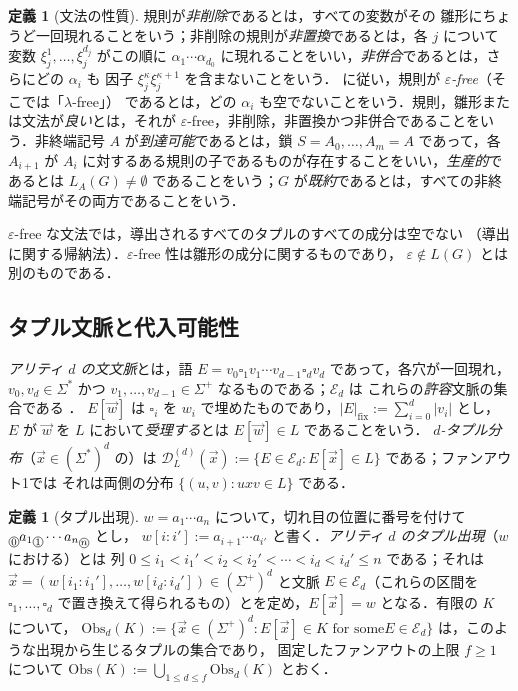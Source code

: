 \documentclass[11pt,a4paper]{ltjsarticle}
\numberwithin{equation}{section}
\theoremstyle{plain}
\theoremstyle{definition}
\newtheorem{definition}[theorem]{定義}
\theoremstyle{remark}
\newcommand{\D}{\mathcal{D}}
\newcommand{\tuple}[1]{\vec{#1}}
\newcommand{\blank}{\square}
\newcommand{\eps}{\varepsilon}
\newcommand{\cutpos}[1]{%
  \raisebox{-0.7ex}{%
    \tikz[baseline=(char.base)]{%
      \node[draw,circle,inner sep=0.4pt,font=\scriptsize]
        (char) {\ensuremath{#1}};%
    }%
  }%
}
\theoremstyle{plain}
\begin{document}
\begin{definition}[文法の性質]
\label{def:grammar-properties}
規則が\emph{非削除}であるとは，すべての変数がその
雛形にちょうど一回現れることをいう；非削除の規則が\emph{非置換}であるとは，各 $j$ について
変数 $\xi_j^1,\ldots,\xi_j^{d_j}$ がこの順に
$\alpha_1\cdots\alpha_{d_0}$ に現れることをいい，\emph{非併合}であるとは，さらにどの $\alpha_i$ も
因子 $\xi_j^\kappa\xi_j^{\kappa+1}$ を含まないことをいう．
\cite[Section~2.3]{Yoshinaka2011} に従い，規則が \emph{$\eps$-free}（そこでは「$\lambda$-free」）
であるとは，どの $\alpha_i$ も空でないことをいう．規則，雛形または文法が\emph{良い}とは，それが
$\eps$-free，非削除，非置換かつ非併合であることをいう．非終端記号 $A$
が\emph{到達可能}であるとは，鎖 $S=A_0,\ldots,A_m=A$ であって，各
$A_{i+1}$ が $A_i$ に対するある規則の子であるものが存在することをいい，\emph{生産的}であるとは
$L_A(G)\ne\emptyset$ であることをいう；$G$ が\emph{既約}であるとは，すべての非終端記号がその両方であることをいう．
\end{definition}

$\eps$-free な文法では，導出されるすべてのタプルのすべての成分は空でない
（導出に関する帰納法）．$\eps$-free 性は雛形の成分に関するものであり，
$\eps\notin L(G)$ とは別のものである．

\subsection{タプル文脈と代入可能性}

\emph{アリティ $d$ の文文脈}とは，語
$E=v_0\blank_1v_1\cdots v_{d-1}\blank_dv_d$ であって，各穴が一回現れ，
$v_0,v_d\in\Sigma^*$ かつ $v_1,\ldots,v_{d-1}\in\Sigma^+$ なるものである；$\mathcal E_d$ は
これらの\emph{許容}文脈の集合である \cite[Section~3.1]{Yoshinaka2011}．
$E[\tuple w]$ は $\blank_i$ を $w_i$ で埋めたものであり，$|E|_{\mathrm{fix}}:=\sum_{i=0}^d|v_i|$ とし，
$E$ が $\tuple w$ を $L$ において\emph{受理する}とは $E[\tuple w]\in L$ であることをいう．
\emph{$d$-タプル分布}（$\tuple x\in(\Sigma^*)^d$ の）は
$\D_L^{(d)}(\tuple x):=\{E\in\mathcal E_d:E[\tuple x]\in L\}$ である；ファンアウト1では
それは両側の分布 $\{(u,v):uxv\in L\}$ である．

\begin{definition}[タプル出現]
\label{def:tuple-occurrence}
$w=a_1\cdots a_n$ について，切れ目の位置に番号を付けて
$\cutpos{0}a_1\cutpos{1}\cdots a_n\cutpos{n}$ とし，
$w[i:i']:=a_{i+1}\cdots a_{i'}$ と書く．\emph{アリティ $d$ のタプル出現}（$w$ における）とは
列 $0\le i_1<i_1'<i_2<i_2'<\cdots<i_d<i_d'\le n$ である；それは
$\tuple x=(w[i_1:i_1'],\ldots,w[i_d:i_d'])\in(\Sigma^+)^d$ と文脈
$E\in\mathcal E_d$（これらの区間を
$\blank_1,\ldots,\blank_d$ で置き換えて得られるもの）とを定め，$E[\tuple x]=w$ となる．有限の $K$ について，
$\mathrm{Obs}_d(K):=\{\tuple x\in(\Sigma^+)^d:E[\tuple x]\in K\text{ for some
}E\in\mathcal E_d\}$ は，このような出現から生じるタプルの集合であり，
固定したファンアウトの上限 $f\ge1$ について
$\mathrm{Obs}(K):=\bigcup_{1\le d\le f}\mathrm{Obs}_d(K)$ とおく．
\end{definition}
\end{document}
